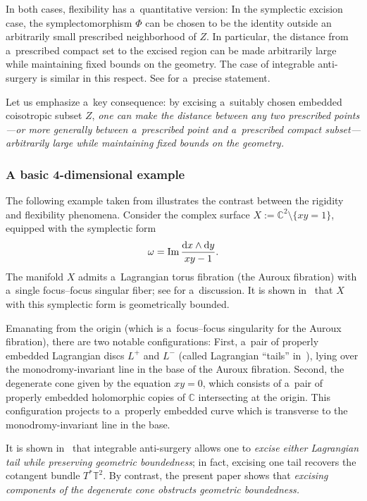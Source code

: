 \documentclass[pdftex]{sigma}
\numberwithin{equation}{section}
\newcommand{\bC}{{\mathbb C}}
\newcommand{\bT}{{\mathbb T}}
\theoremstyle{definition}
\begin{document}
In both cases, flexibility has a~quantitative version: In the symplectic excision case, the symplectomorphism $\Phi$ can be chosen to be the identity outside an arbitrarily small prescribed neighborhood of $Z$. In particular, the distance from a~prescribed compact set to the excised region can be made arbitrarily large while maintaining fixed bounds on the geometry. The case of integrable anti-surgery is similar in this respect. See \cite[Theorem~7.33]{GromanVarolgunesCompleteEmbeddings} for a~precise statement.

Let us emphasize a~key consequence: by excising a~suitably chosen embedded coisotropic subset $Z$, \emph{one can make the distance between \emph{any two prescribed points}---or more generally between a~prescribed point and a~prescribed compact subset---\emph{arbitrarily large} while maintaining fixed bounds on the geometry.}

\subsubsection{A basic 4-dimensional example}
The following example taken from \cite[Remark~7.32]{GromanVarolgunesCompleteEmbeddings} illustrates the contrast between the rigidity and flexibility phenomena. Consider the complex surface
$
X:=\bC^2\setminus\{xy=1\}$,
equipped with the symplectic form
\[
\omega=\operatorname{Im}\frac{{\rm d}x\wedge {\rm d}y}{xy-1}.\]
The manifold $X$ admits a~Lagrangian torus fibration (the Auroux fibration) with a~single focus--focus singular fiber; see \cite[Section~5]{AurouxAnticanonicalTDuality} for a~discussion. It is shown in~\cite{GromanVarolgunesCompleteEmbeddings} that $X$ with this symplectic form is geometrically bounded.

Emanating from the origin (which is a~focus--focus singularity for the Auroux fibration), there are two notable configurations: First, a~pair of properly embedded Lagrangian discs $L^{+}$ and $L^{-}$ (called Lagrangian ``tails'' in~\cite{GromanVarolgunesCompleteEmbeddings}), lying over the monodromy-invariant line in the base of the Auroux fibration. Second, the degenerate cone given by the equation $xy=0$, which consists of a~pair of properly embedded holomorphic copies of $\bC$ intersecting at the origin. This configuration projects to a~properly embedded curve which is transverse to the monodromy-invariant line in the base.

It is shown in~\cite{GromanVarolgunesCompleteEmbeddings} that integrable anti-surgery allows one to \emph{excise either Lagrangian tail while preserving geometric boundedness}; in fact, excising one tail recovers the cotangent bundle $T^*\bT^2$. By contrast, the present paper shows that \emph{excising components of the degenerate cone obstructs geometric boundedness.}
\end{document}
